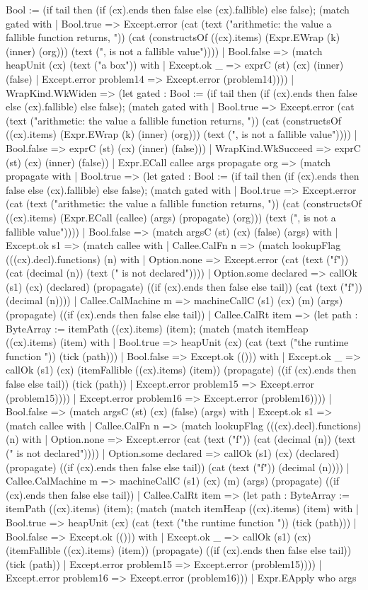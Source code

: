 \documentclass[11pt]{article}
\begin{document}
Bool := (if tail then (if (cx).ends then false else (cx).fallible) else false); (match gated with | Bool.true => Except.error (cat (text ("arithmetic: the value a fallible function returns, ")) (cat (constructsOf ((cx).items) (Expr.EWrap (k) (inner) (org))) (text (", is not a fallible value")))) | Bool.false => (match heapUnit (cx) (text ("a box")) with | Except.ok \_ => exprC (st) (cx) (inner) (false) | Except.error problem14 => Except.error (problem14)))) | WrapKind.WkWiden => (let gated : Bool := (if tail then (if (cx).ends then false else (cx).fallible) else false); (match gated with | Bool.true => Except.error (cat (text ("arithmetic: the value a fallible function returns, ")) (cat (constructsOf ((cx).items) (Expr.EWrap (k) (inner) (org))) (text (", is not a fallible value")))) | Bool.false => exprC (st) (cx) (inner) (false))) | WrapKind.WkSucceed => exprC (st) (cx) (inner) (false)) | Expr.ECall callee args propagate org => (match propagate with | Bool.true => (let gated : Bool := (if tail then (if (cx).ends then false else (cx).fallible) else false); (match gated with | Bool.true => Except.error (cat (text ("arithmetic: the value a fallible function returns, ")) (cat (constructsOf ((cx).items) (Expr.ECall (callee) (args) (propagate) (org))) (text (", is not a fallible value")))) | Bool.false => (match argsC (st) (cx) (false) (args) with | Except.ok s1 => (match callee with | Callee.CalFn n => (match lookupFlag (((cx).decl).functions) (n) with | Option.none => Except.error (cat (text ("f")) (cat (decimal (n)) (text (" is not declared")))) | Option.some declared => callOk (s1) (cx) (declared) (propagate) ((if (cx).ends then false else tail)) (cat (text ("f")) (decimal (n)))) | Callee.CalMachine m => machineCallC (s1) (cx) (m) (args) (propagate) ((if (cx).ends then false else tail)) | Callee.CalRt item => (let path : ByteArray := itemPath ((cx).items) (item); (match (match itemHeap ((cx).items) (item) with | Bool.true => heapUnit (cx) (cat (text ("the runtime function ")) (tick (path))) | Bool.false => Except.ok (())) with | Except.ok \_ => callOk (s1) (cx) (itemFallible ((cx).items) (item)) (propagate) ((if (cx).ends then false else tail)) (tick (path)) | Except.error problem15 => Except.error (problem15)))) | Except.error problem16 => Except.error (problem16)))) | Bool.false => (match argsC (st) (cx) (false) (args) with | Except.ok s1 => (match callee with | Callee.CalFn n => (match lookupFlag (((cx).decl).functions) (n) with | Option.none => Except.error (cat (text ("f")) (cat (decimal (n)) (text (" is not declared")))) | Option.some declared => callOk (s1) (cx) (declared) (propagate) ((if (cx).ends then false else tail)) (cat (text ("f")) (decimal (n)))) | Callee.CalMachine m => machineCallC (s1) (cx) (m) (args) (propagate) ((if (cx).ends then false else tail)) | Callee.CalRt item => (let path : ByteArray := itemPath ((cx).items) (item); (match (match itemHeap ((cx).items) (item) with | Bool.true => heapUnit (cx) (cat (text ("the runtime function ")) (tick (path))) | Bool.false => Except.ok (())) with | Except.ok \_ => callOk (s1) (cx) (itemFallible ((cx).items) (item)) (propagate) ((if (cx).ends then false else tail)) (tick (path)) | Except.error problem15 => Except.error (problem15)))) | Except.error problem16 => Except.error (problem16))) | Expr.EApply who args 
\end{document}
